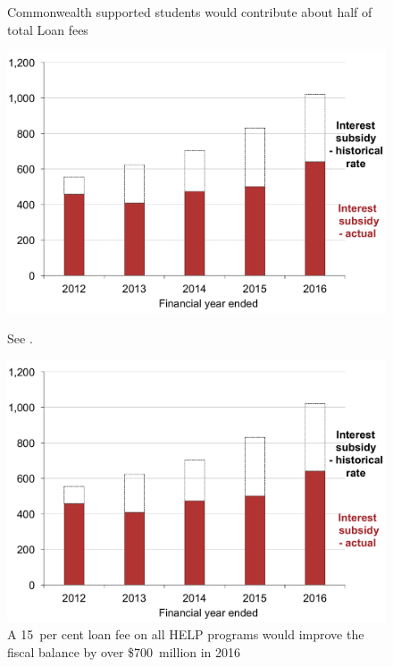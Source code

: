 \documentclass[embargoed]{grattan}
\begin{document}
\begin{figure}
\begin{minipage}[t][\textheight]{\columnwidth}
\vspace{\grattanfptop}
\caption{Commonwealth supported students would contribute about half of total \gls{Loan fees}}\label{fig:fig23-Cth-supported-students-would-contr-half-tot-loan-fees}


\includegraphics[page=23]{atlas/Chartpack.pdf}

{See .}
\end{minipage}
\hfill 
\begin{minipage}[t][\textheight]{\columnwidth}
\vspace{\grattanfptop}
\caption{A 15~per cent loan fee on all \gls{HELP} programs would improve the fiscal balance by over \$700~million in 2016}\label{fig:fig24-a-15pc-loan-fee-all-HELP-progs-would-improve-fisc-bal-by-over-700M-in-2016}


\includegraphics[page=24]{atlas/Chartpack.pdf}


\end{minipage}
\end{figure}
\end{document}
